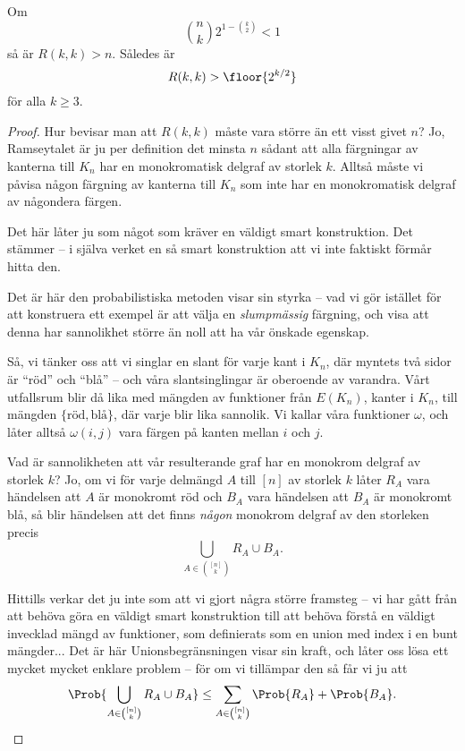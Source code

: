 \documentclass[nobib]{tufte-handout}
\begin{document}
\begin{proposition}
    Om
    $$\binom{n}{k}2^{1-\binom{k}{2}} < 1$$
    så är $R(k,k) > n$. Således är
    $$R(k,k) > \floor{2^{k/2}}$$
    för alla $k\geq 3$.

    \begin{proof}
        Hur bevisar man att $R(k,k)$ måste vara större än ett visst givet $n$? Jo, Ramseytalet är ju per definition det minsta $n$ sådant att alla färgningar av kanterna till $K_n$ har en monokromatisk delgraf av storlek $k$. Alltså måste vi påvisa någon färgning av kanterna till $K_n$ som inte har en monokromatisk delgraf av någondera färgen.

        Det här låter ju som något som kräver en väldigt smart konstruktion. Det stämmer -- i själva verket en så smart konstruktion att vi inte faktiskt förmår hitta den.

        Det är här den probabilistiska metoden visar sin styrka -- vad vi gör istället för att konstruera ett exempel är att välja en \emph{slumpmässig} färgning, och visa att denna har sannolikhet större än noll att ha vår önskade egenskap.

        Så, vi tänker oss att vi singlar en slant för varje kant i $K_n$, där myntets två sidor är ``röd'' och ``blå'' -- och våra slantsinglingar är oberoende av varandra. Vårt utfallsrum blir då lika med mängden av funktioner från $E(K_n)$, kanter i $K_n$, till mängden $\{\text{röd}, \text{blå}\}$, där varje blir lika sannolik. Vi kallar våra funktioner $\omega$, och låter alltså $\omega(i,j)$ vara färgen på kanten mellan $i$ och $j$.

        Vad är sannolikheten att vår resulterande graf har en monokrom delgraf av storlek $k$? Jo, om vi för varje delmängd $A$ till $[n]$ av storlek $k$ låter $R_A$ vara händelsen att $A$ är monokromt röd och $B_A$ vara händelsen att $B_A$ är monokromt blå, så blir händelsen att det finns \emph{någon} monokrom delgraf av den storleken precis
        $$\bigcup_{A \in \binom{[n]}{k}} R_A \cup B_A.$$

        Hittills verkar det ju inte som att vi gjort några större framsteg -- vi har gått från att behöva göra en väldigt smart konstruktion till att behöva förstå en väldigt invecklad mängd av funktioner, som definierats som en union med index i en bunt mängder... Det är här Unionsbegränsningen visar sin kraft, och låter oss lösa ett mycket mycket enklare problem -- för om vi tillämpar den så får vi ju att
        $$\Prob{\bigcup_{A \in \binom{[n]}{k}} R_A \cup B_A} \leq \sum_{A\in \binom{[n]}{k}} \Prob{R_A} + \Prob{B_A}.$$


\end{proof}
\end{proposition}
\end{document}
